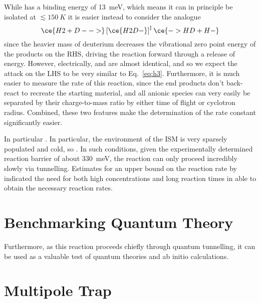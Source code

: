 \documentclass{article}
\begin{document}
While  has a binding energy of \SI{13}{meV}, which means it can in principle be isolated at \( \lesssim\SI{150}{K} \) it is easier instead to consider the analogue
\begin{equation}
    \ce{H2 + D- ->} \left[\ce{H2D-} \right]^\ddagger \ce{-> HD + H- } \label{eq:h2d}
\end{equation}
since the heavier mass of deuterium decreases the vibrational zero point energy of the products on the RHS, driving the reaction forward through a release of energy. However, electrically,  and  are almost identical, and so we expect the attack on the LHS to be very similar to Eq.~\ref{eq:h3}. Furthermore, it is much easier to measure the rate of this reaction, since the end products don't back-react to recreate the starting material, and all anionic species can very easily be separated by their charge-to-mass ratio by either time of flight or cyclotron radius. Combined, these two features make the determination of the rate constant significantly easier.

In particular . In particular, the environment of the ISM is very sparsely populated and cold, so . In such conditions, given the experimentally determined reaction barrier of about \SI{330}{meV}\cite{zimmer_crossed-beam_1995}, the reaction can only proceed incredibly slowly via tunnelling. Estimates for an upper bound on the reaction rate by~\cite{endres_upper_2017} indicated the need for both high concentrations and long reaction times in able to obtain the necessary reaction rates.

\section{Benchmarking Quantum Theory}
Furthermore, as this reaction proceeds chiefly through quantum tunnelling, it can be used as a valuable test of quantum theories and ab initio calculations. 
\section{Multipole Trap}

\section{}

%

\end{document}

